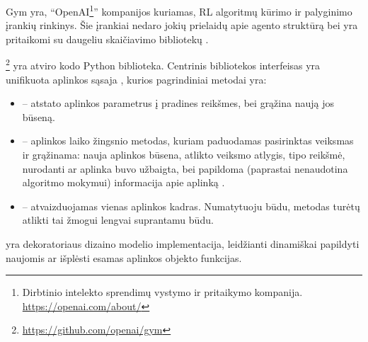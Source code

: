 \documentclass{VUMIFPSbakalaurinis}
\begin{document}
{
	Gym yra, \enquote{OpenAI\footnote{Dirbtinio intelekto sprendimų vystymo ir pritaikymo kompanija. \url{https://openai.com/about/}}} kompanijos kuriamas, RL algoritmų kūrimo ir palyginimo įrankių rinkinys. Šie įrankiai nedaro jokių prielaidų apie agento struktūrą bei yra pritaikomi su daugeliu skaičiavimo bibliotekų \cite{openaiGym}.\par
	
	\footnote{\url{https://github.com/openai/gym}} yra atviro kodo Python biblioteka. Centrinis bibliotekos interfeisas yra unifikuota aplinkos sąsaja , kurios pagrindiniai metodai yra:
	\begin{itemize}
		\item {} -- atstato aplinkos parametrus į pradines reikšmes, bei grąžina naują jos būseną.
		\item {} -- aplinkos laiko žingsnio metodas, kuriam paduodamas pasirinktas veiksmas ir grąžinama: nauja aplinkos būsena, atlikto veiksmo atlygis,  tipo reikšmė, nurodanti ar aplinka buvo užbaigta, bei papildoma (paprastai nenaudotina algoritmo mokymui) informacija apie aplinką .
		\item {} -- atvaizduojamas vienas aplinkos kadras. Numatytuoju būdu, metodas turėtų atlikti tai žmogui lengvai suprantamu būdu.
	\end{itemize}\par

	 yra dekoratoriaus dizaino modelio implementacija, leidžianti dinamiškai papildyti naujomis ar išplėsti esamas  aplinkos objekto funkcijas.
}
\label{subsubsubsec:gym-sokoban}
\end{document}
